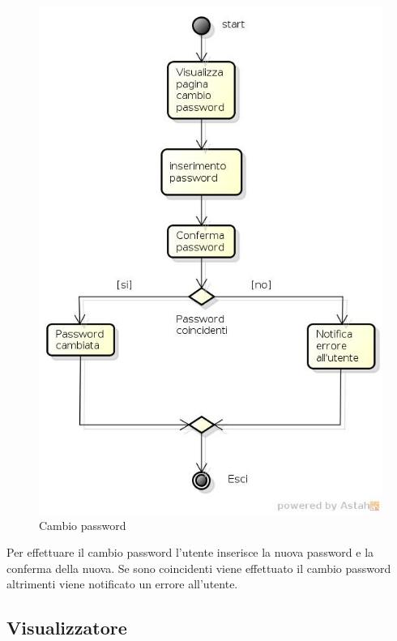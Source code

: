 \begin{figure}[h!]
		\centering
		\includegraphics[scale=.2]{img/Cambio_password.jpg}
		\caption{Cambio password}
		\label{fig:ModelloSpy}
\end{figure}

Per effettuare il cambio password l'utente inserisce la nuova password e la conferma della nuova. Se sono coincidenti viene effettuato il cambio password altrimenti viene notificato un errore all'utente.

\subsection{Visualizzatore}

